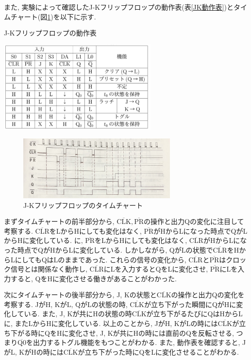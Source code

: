 \documentclass[a4paper, 11pt, uplatex]{jsarticle}
\begin{document}
また,  実験によって確認したJ-Kフリップフロップの動作表(表\ref{JK動作表})とタイムチャート(図\ref{JKタイムチャート})を以下に示す.

\begin{table}[H]
  \begin{center}
    \caption{J-Kフリップフロップの動作表}
    \includegraphics[width = 8cm]{画像/JK動作表.png}
    \label{JK動作表}
  \end{center}
\end{table}

\begin{figure}[H]
  \begin{center}
    \includegraphics[width = 8cm]{画像/JKタイムチャート.jpg}
    \caption{J-Kフリップフロップのタイムチャート}
    \label{JKタイムチャート}
  \end{center}
\end{figure}

まずタイムチャートの前半部分から,  $\overline{\mathrm{CLK}},  \overline{\mathrm{PR}}$の操作と出力Qの変化に注目して考察する.
$\overline{\mathrm{CLR}}$をLからHにしても変化はなく, $\overline{\mathrm{PR}}$がHからLになった時点でQがLからHに変化している.
に,  $\overline{\mathrm{PR}}$をLからHにしても変化はなく, $\overline{\mathrm{CLR}}$がHからLになった時点でQがHからLに変化している.
しかしながら,  QがLの状態で$\overline{\mathrm{CLR}}$をHからLにしてもQはLのままであった.
これらの信号の変化から,  $\overline{\mathrm{CLR}}$と$\overline{\mathrm{PR}}$はクロック信号とは関係なく動作し,
$\overline{\mathrm{CLR}}$にLを入力するとQをLに変化させ,  $\overline{\mathrm{PR}}$にLを入力すると,  QをHに変化させる働きがあることがわかった.
\par
次にタイムチャートの後半部分から,  J, Kの状態と$\overline{\mathrm{CLK}}$の操作と出力Qの変化を考察する.
JがH,  KがL,  QがLの状態の時,  $\overline{\mathrm{CLK}}$が立ち下がった瞬間にQがHに変化している.
また,  J, Kが共にHの状態の時$\overline{\mathrm{CLK}}$が立ち下がるたびにQはHからLに,  またLからHに変化している.
以上のことから,  JがH, KがLの時には$\overline{\mathrm{CLK}}$が立ち下がる時にQをHに変化させ,
J,  Kが共にHの時には直前のQを反転させる, つまり$\overline{\mathrm{Q0}}$を出力するトグル機能をもつことがわかる.
また,  動作表を確認すると,  JがL, KがHの時には$\overline{\mathrm{CLK}}$が立ち下がった時にQをLに変化させることがわかる.
\end{document}
